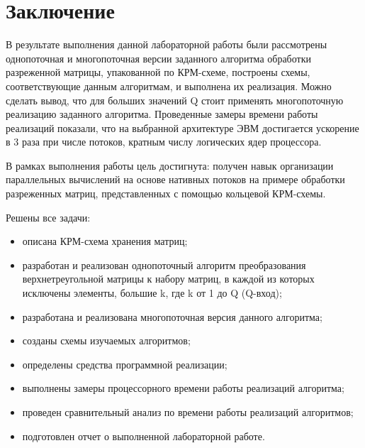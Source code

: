 \chapter*{Заключение}

В результате выполнения данной лабораторной работы были рассмотрены однопоточная и многопоточная версии заданного алгоритма обработки разреженной матрицы, упакованной по КРМ-схеме, построены схемы, соответствующие данным алгоритмам, и выполнена их реализация. Можно сделать вывод, что для больших значений Q стоит применять многопоточную реализацию заданного алгоритма. Проведенные замеры времени работы реализаций показали, что на выбранной архитектуре ЭВМ достигается ускорение в 3 раза при числе потоков, кратным числу логических ядер процессора.

В рамках выполнения работы цель достигнута: получен навык организации параллельных вычислений на основе нативных потоков на примере обработки разреженных матриц, представленных с помощью кольцевой КРМ-схемы.

Решены все задачи:
\begin{itemize}
	\item описана КРМ-схема хранения матриц;
	\item разработан и реализован однопоточный алгоритм преобразования верхнетреугольной матрицы к набору матриц, в каждой из которых исключены элементы, большие k, где k от 1 до Q (Q-вход);
	\item разработана и реализована многопоточная версия данного алгоритма;
	\item созданы схемы изучаемых алгоритмов;
	\item определены средства программной реализации;
	\item выполнены замеры процессорного времени работы реализаций алгоритма;
	\item проведен сравнительный анализ по времени работы реализаций алгоритмов;
	\item подготовлен отчет о выполненной лабораторной работе.
\end{itemize}